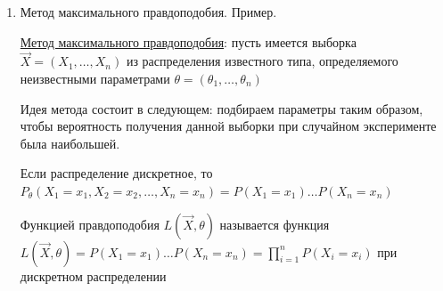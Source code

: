 \begin{enumerate}
    \Ex Пусть $X \in U(a, b)$. Обработав статданные, нашли оценки первого и второго моментов: $\overline{x} = 2.25; \overline{x^2} = 6.75$. 
    Нужно найти оценки параметров $a^*, b^*$

    $EX = \int_a^b x \frac{1}{b - a} dx = \frac{a + b}{2}$

    $EX^2 = \int_a^b x^2 \frac{1}{b - a} dx = \frac{a^2 + ab + b^2}{3}$

    Получаем:

    $\begin{cases}
        \overline{x} = \frac{a^* + b^*}{2} \\ 
        \overline{x^2} = \frac{a^{*2} + a^* b^* + b^{*2}}{3} \\ 
    \end{cases} \Longleftrightarrow \begin{cases}
        a^* + b^* = 4.5 \\ 
        a^{*2} + a^* b^* + b^{*2} = 20.25 \\ 
    \end{cases} \Longleftrightarrow \begin{cases}
        a^* + b^* = 4.5 \\ 
        a^* b^* = 0 \\ 
    \end{cases} \Longleftrightarrow \begin{cases}
        a^* = 0 \\ 
        b^* = 4.5 \\ 
    \end{cases}$

    \item Метод максимального правдоподобия. Пример.

    \hyperlink{maximum_likelihood_estimation}{Метод максимального правдоподобия}: пусть имеется выборка $\vec{X} = (X_1, \dots, X_n)$ из распределения известного типа, определяемого неизвестными параметрами 
    $\theta = (\theta_1, \dots, \theta_n)$

    Идея метода состоит в следующем: подбираем параметры таким образом, чтобы вероятность получения
    данной выборки при случайном эксперименте была наибольшей.

    Если распределение дискретное, то $P_{\theta} (X_1 = x_1, X_2 = x_2, \dots, X_n = x_n) = P(X_1 = x_1) \dots P(X_n = x_n)$

    \Defs Функцией правдоподобия $L(\vec{X}, \theta)$ называется функция $L(\vec{X}, \theta) = P(X_1 = x_1) \dots P(X_n = x_n) = \prod_{i = 1}^n P(X_i = x_i)$ при дискретном распределении


\end{enumerate}
